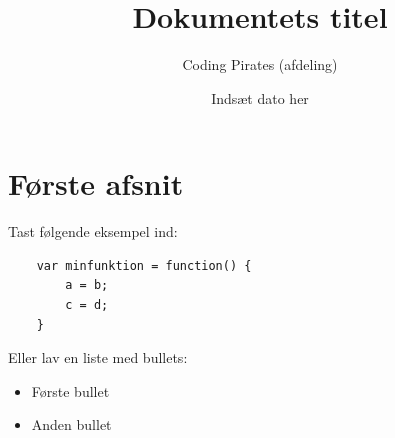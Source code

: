 \documentclass[oneside,a4paper]{scrartcl}
\title{Dokumentets titel}
\author{Coding Pirates (afdeling)}
\date{Indsæt dato her}
\begin{document}
\maketitle
\thispagestyle{cptitle}



\section{Første afsnit}
Tast følgende eksempel ind:
\begin{lstlisting}
    var minfunktion = function() {
    	a = b;
    	c = d;
    }
\end{lstlisting}
Eller lav en liste med bullets:
\begin{itemize}
	\item Første bullet
	\item Anden bullet
\end{itemize}
\end{document}
